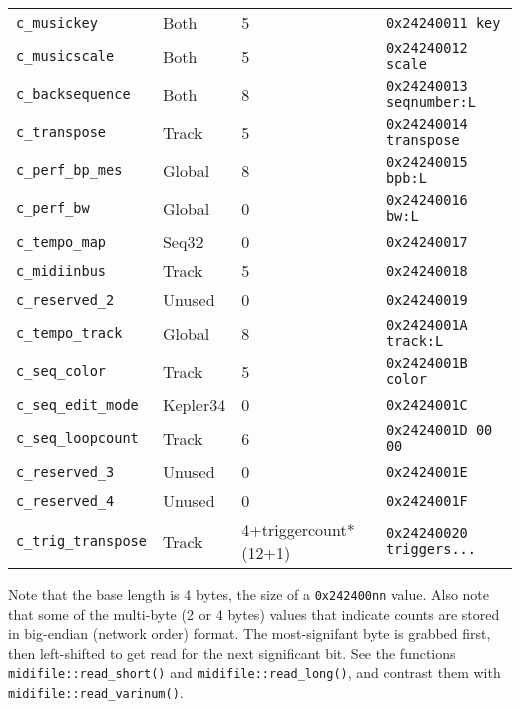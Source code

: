 \begin{table}[htb]
\begin{tabular}{l l l l}
         \texttt{c\_musickey}        & Both          & 5                 & \texttt{0x24240011 key} \\
         \texttt{c\_musicscale}      & Both          & 5                 & \texttt{0x24240012 scale} \\
         \texttt{c\_backsequence}    & Both          & 8                 & \texttt{0x24240013 seqnumber:L} \\
         \texttt{c\_transpose}       & Track         & 5                 & \texttt{0x24240014 transpose} \\
         \texttt{c\_perf\_bp\_mes}   & Global        & 8                 & \texttt{0x24240015 bpb:L} \\
         \texttt{c\_perf\_bw}        & Global        & 0                 & \texttt{0x24240016 bw:L} \\
         \texttt{c\_tempo\_map}      & Seq32         & 0                 & \texttt{0x24240017} \\
         \texttt{c\_midiinbus}       & Track         & 5                 & \texttt{0x24240018} \\
         \texttt{c\_reserved\_2}     & Unused        & 0                 & \texttt{0x24240019} \\
         \texttt{c\_tempo\_track}    & Global        & 8                 & \texttt{0x2424001A track:L} \\
         \texttt{c\_seq\_color}      & Track         & 5                 & \texttt{0x2424001B color} \\
         \texttt{c\_seq\_edit\_mode} & Kepler34      & 0                 & \texttt{0x2424001C} \\
         \texttt{c\_seq\_loopcount}  & Track         & 6                 & \texttt{0x2424001D 00 00} \\
         \texttt{c\_reserved\_3}     & Unused        & 0                 & \texttt{0x2424001E} \\
         \texttt{c\_reserved\_4}     & Unused        & 0                 & \texttt{0x2424001F} \\
         \texttt{c\_trig\_transpose} & Track     & 4+triggercount*(12+1) & \texttt{0x24240020 triggers...} \\
      \end{tabular}
   \end{table}

   Note that the base length is 4 bytes, the size of a \texttt{0x242400nn}
   value.  Also note that some of the multi-byte (2 or 4 bytes) values that
   indicate counts are stored in big-endian (network order) format.  The
   most-signifant byte is grabbed first, then
   left-shifted to get read for the next significant bit.
   See the functions
   \texttt{midifile::read\_short()} and
   \texttt{midifile::read\_long()}, and contrast them with
   \texttt{midifile::read\_varinum()}.

